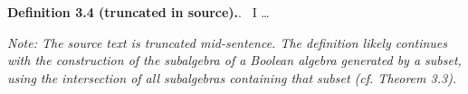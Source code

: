 \textbf{Definition 3.4 (truncated in source).}.\  I \neq \ldots

\textit{Note: The source text is truncated mid-sentence. The definition likely continues with the construction of the subalgebra of a Boolean algebra generated by a subset, using the intersection of all subalgebras containing that subset (cf. Theorem 3.3).}
